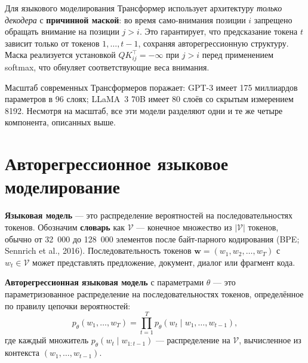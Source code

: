 \begin{remark}
Для языкового моделирования Трансформер использует архитектуру \emph{только декодера} с \textbf{причинной маской}: во время само-внимания позиции $i$ запрещено обращать внимание на позиции $j > i$. Это гарантирует, что предсказание токена $t$ зависит только от токенов $1, \ldots, t-1$, сохраняя авторегрессионную структуру. Маска реализуется установкой $QK^\top_{ij} = -\infty$ при $j > i$ перед применением softmax, что обнуляет соответствующие веса внимания.
\end{remark}

Масштаб современных Трансформеров поражает: GPT-3 имеет 175 миллиардов параметров в 96 слоях; LLaMA~3 70B имеет 80 слоёв со скрытым измерением 8192. Несмотря на масштаб, все эти модели разделяют одни и те же четыре компонента, описанных выше.

\section{Авторегрессионное языковое моделирование}
\label{sec:autoregressive-lm}

\textbf{Языковая модель} --- это распределение вероятностей на последовательностях токенов. Обозначим \textbf{словарь} как $\mathcal{V}$ --- конечное множество из $|\mathcal{V}|$ токенов, обычно от 32~000 до 128~000 элементов после байт-парного кодирования (BPE; Sennrich et al., 2016). Последовательность токенов $\mathbf{w} = (w_1, w_2, \ldots, w_T)$ с $w_t \in \mathcal{V}$ может представлять предложение, документ, диалог или фрагмент кода.

\begin{definition}
\label{def:autoregressive-lm}
\textbf{Авторегрессионная языковая модель} с параметрами $\theta$ --- это параметризованное распределение на последовательностях токенов, определённое по правилу цепочки вероятностей:
\begin{equation}
\label{eq:lm-chain-rule}
p_\theta(w_1, \ldots, w_T) = \prod_{t=1}^{T} p_\theta(w_t \mid w_1, \ldots, w_{t-1}),
\end{equation}
где каждый множитель $p_\theta(w_t \mid w_{1:t-1})$ --- распределение на $\mathcal{V}$, вычисленное из контекста $(w_1, \ldots, w_{t-1})$.
\end{definition}

